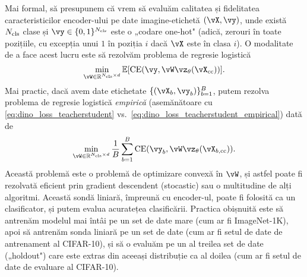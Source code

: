 \documentclass[../../book-main_ro.tex]{subfiles}
\begin{document}
Mai formal, să presupunem că vrem să evaluăm calitatea și fidelitatea caracteristicilor encoder-ului pe date imagine-etichetă \((\vX, \vy)\), unde există \(N_{\mathrm{cls}}\) clase și \(\vy \in \{0, 1\}^{N_{\cls}}\) este o „codare one-hot" (adică, zerouri în toate pozițiile, cu excepția unui \(1\) în poziția \(i\) dacă \(\vX\) este în clasa \(i\)). O modalitate de a face acest lucru este să rezolvăm problema de regresie logistică 
\begin{equation}\label{eq:linear_probing}
    \min_{\vW \in \R^{N_{\cls} \times d}}\Ex[\CE(\vy, \vW \vz_{\theta}(\vX_{\cc}))].
\end{equation}
Mai practic, dacă avem date etichetate \(\{(\vX_{b}, \vy_{b})\}_{b = 1}^{B}\), putem rezolva problema de regresie logistică \textit{empirică} (asemănătoare cu \eqref{eq:dino_loss_teacherstudent} vs.~\eqref{eq:dino_loss_teacherstudent_empirical}) dată de 
\begin{equation}\label{eq:linear_probing_empirical}
    \min_{\vW \in \R^{N_{\cls} \times d}}\frac{1}{B}\sum_{b = 1}^{B}\CE(\vy_{b}, \vW \vz_{\theta}(\vX_{b, \cc})).
\end{equation}
Această problemă este o problemă de optimizare convexă în \(\vW\), și astfel poate fi rezolvată eficient prin gradient descendent (stocastic) sau o multitudine de alți algoritmi. Această sondă liniară, împreună cu encoder-ul, poate fi folosită ca un clasificator, și putem evalua acuratețea clasificării. Practica obișnuită este să antrenăm modelul mai întâi pe un set de date mare (cum ar fi ImageNet-1K), apoi să antrenăm sonda liniară pe un set de date (cum ar fi setul de date de antrenament al CIFAR-10), și să o evaluăm pe un al treilea set de date („holdout") care este extras din aceeași distribuție ca al doilea (cum ar fi setul de date de evaluare al CIFAR-10).
\end{document}
